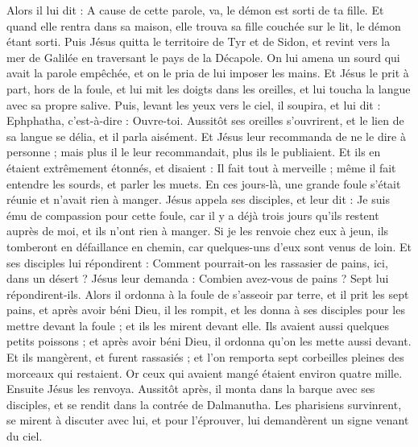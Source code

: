 \begin{multicols}{2}
Alors il lui dit : A cause de cette parole, va, le démon est sorti de ta fille.
Et quand elle rentra dans sa maison, elle trouva sa fille couchée sur le lit, le démon étant sorti.
Puis Jésus quitta le territoire de Tyr et de Sidon, et revint vers la mer de Galilée en traversant le pays de la Décapole.
On lui amena un sourd qui avait la parole empêchée, et on le pria de lui imposer les mains.
Et Jésus le prit à part, hors de la foule, et lui mit les doigts dans les oreilles, et lui toucha la langue avec sa propre salive.
Puis, levant les yeux vers le ciel, il soupira, et lui dit : Ephphatha, c'est-à-dire : Ouvre-toi.
Aussitôt ses oreilles s'ouvrirent, et le lien de sa langue se délia, et il parla aisément.
Et Jésus leur recommanda de ne le dire à personne ; mais plus il le leur recommandait, plus ils le publiaient.
Et ils en étaient extrêmement étonnés, et disaient : Il fait tout à merveille ; même il fait entendre les sourds, et parler les muets.
\VerseOne{}En ces jours-là, une grande foule s'était réunie et n'avait rien à manger. Jésus appela ses disciples, et leur dit :
Je suis ému de compassion pour cette foule, car il y a déjà trois jours qu'ils restent auprès de moi, et ils n'ont rien à manger.
Si je les renvoie chez eux à jeun, ils tomberont en défaillance en chemin, car quelques-uns d'eux sont venus de loin.
Et ses disciples lui répondirent : Comment pourrait-on les rassasier de pains, ici, dans un désert ?
Jésus leur demanda : Combien avez-vous de pains ? Sept lui répondirent-ils.
Alors il ordonna à la foule de s'asseoir par terre, et il prit les sept pains, et après avoir béni Dieu, il les rompit, et les donna à ses disciples pour les mettre devant la foule ; et ils les mirent devant elle.
Ils avaient aussi quelques petits poissons ; et après avoir béni Dieu, il ordonna qu'on les mette aussi devant.
Et ils mangèrent, et furent rassasiés ; et l'on remporta sept corbeilles pleines des morceaux qui restaient.
Or ceux qui avaient mangé étaient environ quatre mille. Ensuite Jésus les renvoya.
Aussitôt après, il monta dans la barque avec ses disciples, et se rendit dans la contrée de Dalmanutha.
Les pharisiens survinrent, se mirent à discuter avec lui, et pour l'éprouver, lui demandèrent un signe venant du ciel.

\end{multicols}
